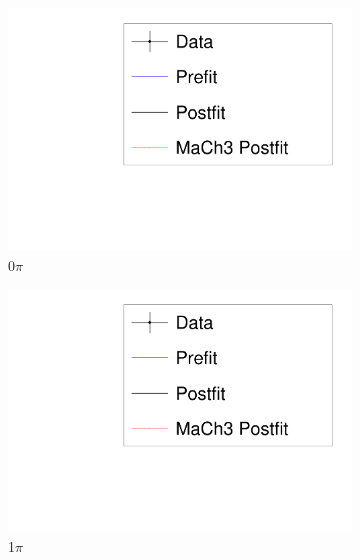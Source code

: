 \begin{figure}
\begin{subfigure}[t]{0.32\textwidth}
	\includegraphics[width=\textwidth, trim={5mm 3mm 15mm 10mm}, clip, page=2]{figures/mach3/banff/mach3banff_mom}
	\caption{0$\pi$}
\end{subfigure}
	\begin{subfigure}[t]{0.32\textwidth}
		\includegraphics[width=\textwidth, trim={5mm 3mm 15mm 10mm}, clip, page=3]{figures/mach3/banff/mach3banff_mom}
		\caption{1$\pi$}
	\end{subfigure}
	\begin{subfigure}[t]{0.32\textwidth}

\end{subfigure}
\end{figure}
